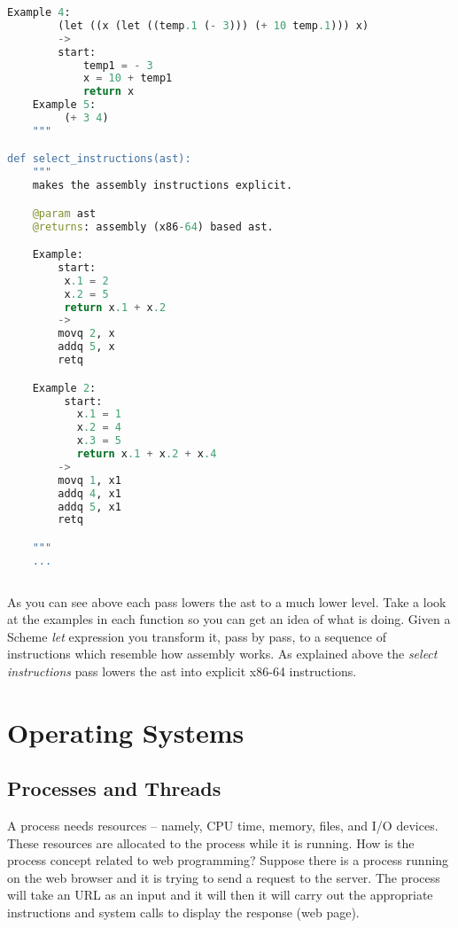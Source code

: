 \documentclass{amsbook}
\begin{document}
\begin{lstlisting}[language=python]
    Example 4:
        (let ((x (let ((temp.1 (- 3))) (+ 10 temp.1))) x)
        ->
        start:
            temp1 = - 3
            x = 10 + temp1
            return x
    Example 5:
         (+ 3 4)
    """

def select_instructions(ast):
    """
    makes the assembly instructions explicit.

    @param ast
    @returns: assembly (x86-64) based ast.

    Example:
        start:
         x.1 = 2
         x.2 = 5
         return x.1 + x.2
        ->
        movq 2, x
        addq 5, x
        retq

    Example 2:
         start:
           x.1 = 1
           x.2 = 4
           x.3 = 5
           return x.1 + x.2 + x.4
        ->
        movq 1, x1
        addq 4, x1
        addq 5, x1
        retq

    """
    ...
    
\end{lstlisting}

As you can see above each pass lowers the ast to a much lower level. Take a look at the examples in each function so you can get an idea of what is doing. Given a Scheme \textit{let} expression you transform it, pass by pass, to a sequence of instructions which resemble how assembly works. As explained above the \textit{select instructions} pass lowers the ast into explicit x86-64 instructions.

\chapter{Operating Systems}

\section{Processes and Threads}

A process needs resources -- namely, CPU time, memory, files, and I/O devices. These resources are allocated to the process while it is running. How is the process concept related to web programming? Suppose there is a process running on the web browser and it is trying to send a request to the server. The process will take an URL as an input and it will then it will carry out the appropriate instructions and system calls to display the response (web page).
\end{document}
